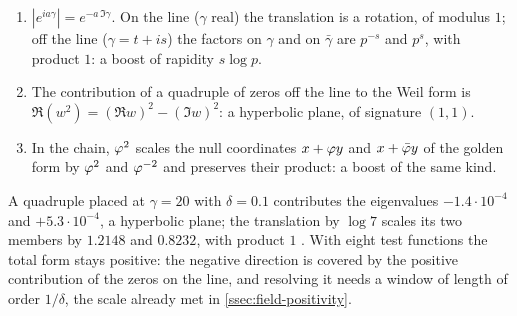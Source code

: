 \begin{proposition}\label{prop:bridge-boosts}
\begin{enumerate}[label=\textup{(\roman*)}]
  \item $|e^{ia\gamma}|=e^{-a\,\Im\gamma}$.  On the line ($\gamma$ real) the translation is a rotation,
    of modulus $1$; off the line ($\gamma=t+is$) the factors on $\gamma$ and on $\bar\gamma$ are
    $p^{-s}$ and $p^{s}$, with product $1$: a boost of rapidity $s\log p$.
  \item The contribution of a quadruple of zeros off the line to the Weil form is
    $\Re(w^2)=(\Re w)^2-(\Im w)^2$: a hyperbolic plane, of signature $(1,1)$.
  \item In the chain, $\varphi^2$ scales the null coordinates $x+\varphi y$ and $x+\bar{\varphi} y$ of the golden
    form by $\varphi^2$ and $\varphi^{-2}$ and preserves their product: a boost of the same kind.
\end{enumerate}

\end{proposition}

A quadruple placed at $\gamma=20$ with $\delta=0.1$ contributes the eigenvalues
$-1.4\cdot10^{-4}$ and $+5.3\cdot10^{-4}$, a hyperbolic plane; the translation by $\log7$ scales
its two members by $1.2148$ and $0.8232$, with product $1$ .  With
eight test functions the total form stays positive: the negative direction is covered by
the positive contribution of the zeros on the line, and resolving it needs a window of
length of order $1/\delta$, the scale already met in \cref{ssec:field-positivity}.

